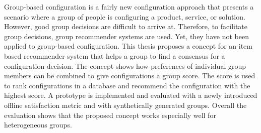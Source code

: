 \Abstract

Group-based configuration is a fairly new configuration approach that presents a scenario where a group of people is configuring a product, service, or solution. However, good group decisions are difficult to arrive at. Therefore, to facilitate group decisions, group recommender systems are used. Yet, they have not been applied to group-based configuration. This thesis proposes a concept for an item based recommender system that helps a group to find a consensus for a configuration decision. The concept shows how preferences of individual group members can be combined to give configurations a group score. The score is used to rank configurations in a database and recommend the configuration with the highest score.
A prototype is implemented and evaluated with a newly introduced offline satisfaction metric and with synthetically generated groups. Overall the evaluation shows that the proposed concept works especially well for heterogeneous groups.
